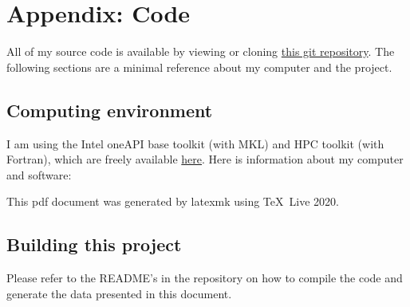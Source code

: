 \documentclass{article}
\begin{document}
\newpage

\section{
Appendix: Code
}

All of my source code is available by viewing or cloning
\href{https://github.com/lxvm/ph121c.git}{this git repository}.
The following sections are a minimal reference about my computer
and the project.

\subsection{
Computing environment
}

I am using the Intel oneAPI base toolkit (with MKL)
and HPC toolkit (with Fortran), which are freely available
\href{https://software.intel.com/content/www/us/en/develop/
articles/free-intel-software-developer-tools.html}{here}.
Here is information about my computer and software:



This pdf document was generated by latexmk using \TeX\ Live 2020.

\subsection{
Building this project
}

Please refer to the README's in the repository on how to compile the
code and generate the data presented in this document.
\end{document}
